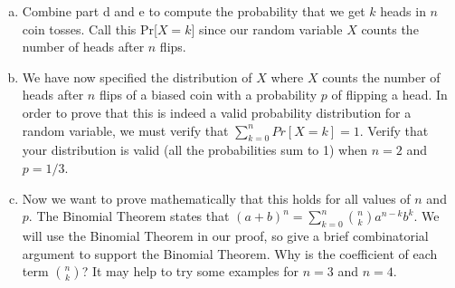 \documentclass[]{article}
\newif\ifsolutions
\renewcommand{\answer}[1]{{\color{mydarkblue}\textbf{Solution:}#1}}
\begin{document}
\begin{qunlist}
\begin{enumerate}[a)]
 \ifsolutions{ \answer {
  Again, because the coin tosses are independent, we multiply the probability of the result of each coin toss. Since we have $k$ heads, the probability of those $k$ heads is $p^k$, but we still have count the probability the rest of the $n-k$ coins are tails which is $(1-p)^{n-k}$. Therefore we get $p^k(1-p)^{n-k}$. It does not matter what order the heads and tails are because multiplication is commutative (that is $a*b = b*a$).
  }} 
  \fi
\item Combine part d and e to compute the probability that we get $k$
  heads in $n$ coin tosses. Call this Pr[$X = k$] since our random variable $X$ counts the number of heads after $n$ flips. 
  
 \ifsolutions{ \answer {
  Part e computes the probability of a particular sequence of $k$ heads and $n-k$ tails. Part d counts \textit{how many} of these sequences exist. Therefore, to count the probability of getting $k$ heads in $n$ coin tosses we multiply our answer to part d and part e. $Pr[X = k] = \binom{n}{k}p^k(1-p)^{n-k}$
  }} 
  \fi
\qpart
\item We have now specified the distribution of $X$ where $X$ counts
  the number of heads after $n$ flips of a biased coin with a
  probability $p$ of flipping a head. In order to prove that this is
  indeed a valid probability distribution for a random variable, we
  must verify that $\sum\nolimits_{k=0}^n Pr[X=k] = 1$. Verify that
  your distribution is valid (all the probabilities sum to 1) when
  $n=2$ and $p=1/3$.  
  
 \ifsolutions{ \answer {
  We wish to show that $Pr[X=0] + Pr[X=1] +Pr[X=2] = 1$ \\ $\sum\nolimits_{k=0}^2 Pr[X=k] = \binom{2}{0}(1/3)^0(1-(1/3))^{2-0} + \binom{2}{1}(1/3)^1(1-(1/3))^{2-1} + \binom{2}{2}(1/3)^2(1-(1/3))^{2-2} \\ = \binom{2}{0}(1/3)^0(2/3)^{2} + \binom{2}{1}(1/3)^1(2/3)^1 + \binom{2}{2}(1/3)^2(2/3)^0 \\ = \binom{2}{0}(4/9) + \binom{2}{1}(2/9) + \binom{2}{2}(1/9) =  1(4/9) + 2(2/9) + 1(1/9) = 4/9 + 4/9 +1/9 \\ = 1 $
  }} 
  \fi
\qpart
\item Now we want to prove mathematically that this holds for all
  values of $n$ and $p$. The Binomial Theorem states that $(a+b)^n =
  \sum\nolimits_{k=0}^n \binom{n}{k} a^{n-k}b^k $. We will use the
  Binomial Theorem in our proof, so give a brief combinatorial
  argument to support the Binomial Theorem. Why is the coefficient of
  each term $\binom{n}{k}$? It may help to try some examples for $n=3$
  and $n=4$. 
  

\end{enumerate}
\end{qunlist}
\end{document}
